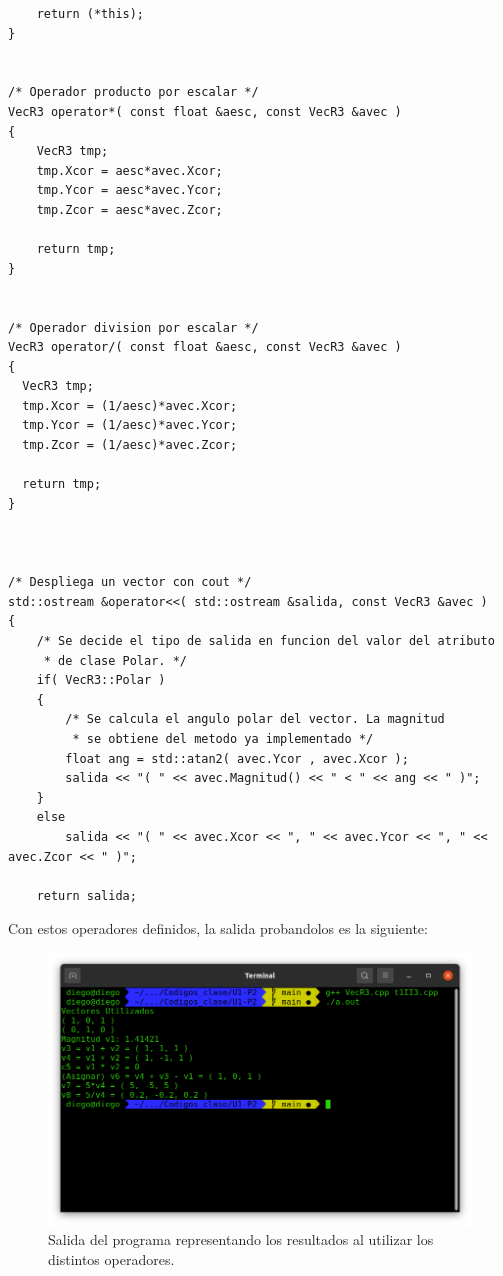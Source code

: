 \begin{lstlisting}
    return (*this);
}


/* Operador producto por escalar */
VecR3 operator*( const float &aesc, const VecR3 &avec )
{
    VecR3 tmp;
    tmp.Xcor = aesc*avec.Xcor;
    tmp.Ycor = aesc*avec.Ycor;
    tmp.Zcor = aesc*avec.Zcor;

    return tmp;
}


/* Operador division por escalar */
VecR3 operator/( const float &aesc, const VecR3 &avec )
{
  VecR3 tmp;
  tmp.Xcor = (1/aesc)*avec.Xcor;
  tmp.Ycor = (1/aesc)*avec.Ycor;
  tmp.Zcor = (1/aesc)*avec.Zcor;

  return tmp;
}



/* Despliega un vector con cout */
std::ostream &operator<<( std::ostream &salida, const VecR3 &avec )
{
    /* Se decide el tipo de salida en funcion del valor del atributo
     * de clase Polar. */
    if( VecR3::Polar )
    {
        /* Se calcula el angulo polar del vector. La magnitud
         * se obtiene del metodo ya implementado */
        float ang = std::atan2( avec.Ycor , avec.Xcor );
        salida << "( " << avec.Magnitud() << " < " << ang << " )";
    }
    else
        salida << "( " << avec.Xcor << ", " << avec.Ycor << ", " << avec.Zcor << " )";

    return salida;
\end{lstlisting}


Con estos operadores definidos, la salida probandolos es la siguiente:
\begin{figure}[H]
	\centering
	\includegraphics[scale=0.5]{./img/output.png}
	\caption{Salida del programa representando los resultados al utilizar los distintos operadores.}
	\label{output}
\end{figure}
